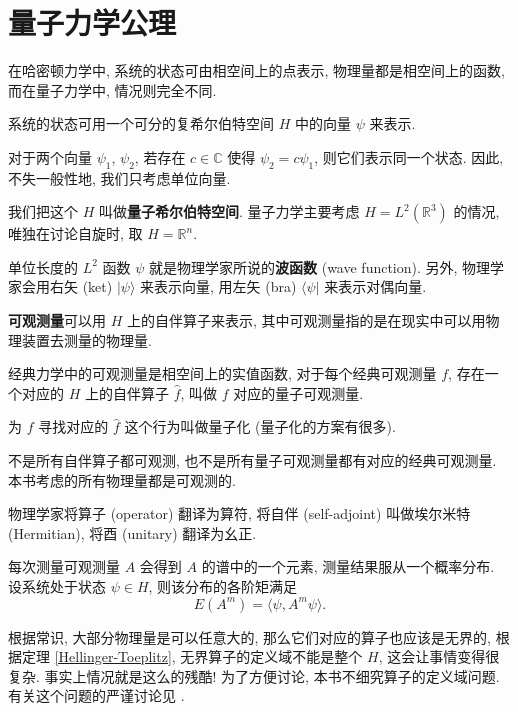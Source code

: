 \section{量子力学公理}
在哈密顿力学中, 系统的状态可由相空间上的点表示, 物理量都是相空间上的函数, 而在量子力学中, 情况则完全不同.
\begin{quantumaxiom}
    系统的状态可用一个可分的复希尔伯特空间 $ H $ 中的向量 $ \psi $ 来表示. 
    
    对于两个向量 $ \psi_1 $, $ \psi_2 $, 若存在 $ c\in\mathbb{C} $ 使得 $ \psi_2=c\psi_1 $, 则它们表示同一个状态. 因此, 不失一般性地, 我们只考虑单位向量.
\end{quantumaxiom}

我们把这个 $ H $ 叫做{\bf 量子希尔伯特空间}. 量子力学主要考虑 $ H=L^2(\mathbb{R}^3) $ 的情况, 唯独在讨论自旋时, 取 $ H=\mathbb{R}^n $.

单位长度的 $ L^2 $ 函数 $ \psi $ 就是物理学家所说的{\bf 波函数} (wave function). 另外, 物理学家会用右矢 (ket) $ |\psi\rangle $ 来表示向量, 用左矢 (bra) $ \langle\psi| $ 来表示对偶向量.

\begin{quantumaxiom}
    {\bf 可观测量}可以用 $ H $ 上的自伴算子来表示, 其中可观测量指的是在现实中可以用物理装置去测量的物理量. 
    
    经典力学中的可观测量是相空间上的实值函数, 对于每个经典可观测量 $ f $, 存在一个对应的 $ H $ 上的自伴算子 $ \hat{f} $, 叫做 $ f $ 对应的量子可观测量.
\end{quantumaxiom}

为 $ f $ 寻找对应的 $ \hat{f} $ 这个行为叫做量子化 (量子化的方案有很多). 

\begin{remark}
    不是所有自伴算子都可观测, 也不是所有量子可观测量都有对应的经典可观测量. 本书考虑的所有物理量都是可观测的.
\end{remark}

物理学家将算子 (operator) 翻译为算符, 将自伴 (self-adjoint) 叫做埃尔米特 (Hermitian), 将酉 (unitary) 翻译为幺正.

\begin{quantumaxiom}
    每次测量可观测量 $ A $ 会得到 $ A $ 的谱中的一个元素, 测量结果服从一个概率分布. 设系统处于状态 $ \psi\in H $, 则该分布的各阶矩满足
    \[ E(A^m)=\langle \psi,A^m\psi \rangle. \]
\end{quantumaxiom}

根据常识, 大部分物理量是可以任意大的, 那么它们对应的算子也应该是无界的, 根据定理 \ref{Hellinger-Toeplitz}, 无界算子的定义域不能是整个 $ H $, 这会让事情变得很复杂. 事实上情况就是这么的残酷! 为了方便讨论, 本书不细究算子的定义域问题. 有关这个问题的严谨讨论见 \cite[第 9 章]{hall2013quantum}.

